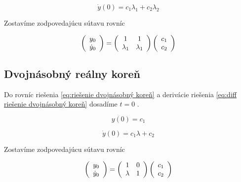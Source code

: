 \documentclass[a4paper,10pt]{article}
\begin{document}
\begin{equation}
	\dot{y}(0)= c_1\lambda_1+c_2\lambda_2
\end{equation}

Zostavíme zodpovedajúcu sútavu rovníc

\begin{equation}
\label{eq: sústava pre dvojnásobný koreň}
	\left(\begin{array}{c}
		y_0\\
		\dot{y}_0\\
	\end{array}\right)=
	\left(\begin{array}{c c}
	 	1 & 1 \\
	 	\lambda_1 & \lambda_1 \\
	\end{array}\right)
	\left(\begin{array}{c}
		c_1\\
		c_2\\
	\end{array}\right)
\end{equation}


\subsection{Dvojnásobný reálny koreň}
 
Do rovníc riešenia \eqref{eq:riešenie dvojnásobný koreň} a derivácie riešenia \eqref{eq:diff riešenie dvojnásobný koreň} dosadíme $t=0$ .
 
\begin{equation}
	y(0)= c_1
\end{equation}
	
\begin{equation}
	\dot{y}(0)=c_1\lambda+c_2
\end{equation}

Zostavíme zodpovedajúcu sútavu rovníc

\begin{equation}
\label{eq: sústava pre reálne korene}
	\left(\begin{array}{c}
		y_0\\
		\dot{y}_0\\
	\end{array}\right)=
	\left(\begin{array}{c c}
	 	1 & 0 \\
	 	\lambda & 1 \\
	\end{array}\right)
	\left(\begin{array}{c}
		c_1\\
		c_2\\
	\end{array}\right)
\end{equation}
\end{document}

